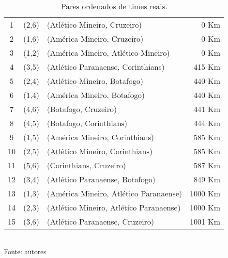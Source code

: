 \documentclass[12pt,a4paper]{article}
\begin{document}
\begin{table}[H]
	\centering
	\caption{Pares ordenados de times reais.}
	\label{tab:reais}
	\vspace{0.2cm}
	\begin{tabular}{cclr}
		\toprule
		 1 & (2,6) & (Atlético Mineiro, Cruzeiro) & 0 Km \\
		 2 & (1,6) & (América Mineiro, Cruzeiro) & 0 Km \\
		 3 & (1,2) & (América Mineiro, Atlético Mineiro) & 0 Km \\
		 4 & (3,5) & (Atlético Paranaense, Corinthians) & 415 Km \\
		 5 & (2,4) & (Atlético Mineiro, Botafogo) & 440 Km \\
		 6 & (1,4) & (América Mineiro, Botafogo) & 440 Km \\
		 7 & (4,6) & (Botafogo, Cruzeiro) & 441 Km \\
		 8 & (4,5) & (Botafogo, Corinthians) & 444 Km \\
		 9 & (1,5) & (América Mineiro, Corinthians) & 585 Km \\
		10 & (2,5) & (Atlético Mineiro, Corinthians) & 585 Km \\
		11 & (5,6) & (Corinthians, Cruzeiro) & 587 Km \\
		12 & (3,4) & (Atlético Paranaense, Botafogo) & 849 Km \\
		13 & (1,3) & (América Mineiro, Atlético Paranaense) & 1000 Km \\
		14 & (2,3) & (Atlético Mineiro, Atlético Paranaense) & 1000 Km \\
		15 & (3,6) & (Atlético Paranaense, Cruzeiro) & 1001 Km \\
		\bottomrule
	\end{tabular}
	\vspace{0.2cm}\\
	\footnotesize Fonte: autores
\end{table}
\end{document}
